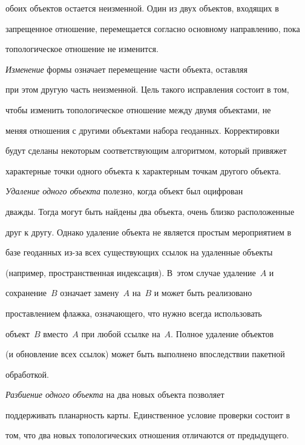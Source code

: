 обоих объектов остается неизменной. Один из двух объектов, входящих в 


запрещенное отношение, перемещается согласно основному направлению, пока 


топологическое отношение не изменится. 


    


    \textit{Изменение} формы означает перемещение части объекта, оставляя 


при этом другую часть неизменной. Цель такого исправления состоит в том, 


чтобы изменить топологическое отношение между двумя объектами, не 


меняя отношения с другими объектами набора геоданных. Корректировки 


будут сделаны некоторым соответствующим алгоритмом, который привяжет 


характерные точки одного объекта к характерным точкам другого объекта. 


    


    \textit{Удаление одного объекта} полезно, когда объект был оцифрован 


дважды. Тогда могут быть найдены два объекта, очень близко расположенные 


друг к другу. Однако удаление объекта не является простым мероприятием в 


базе геоданных из-за всех существующих ссылок на удаленные объекты 


(например, пространственная индексация). В~этом случае удаление~$A$ и 


сохранение~$B$ означает замену~$A$ на~$B$ и может быть реализовано 


проставлением флажка, означающего, что нужно всегда использовать 


объект~$B$ вместо~$A$ при любой ссылке на~$A$. Полное удаление объектов 


(и обновление всех ссылок) может быть выполнено впоследствии пакетной 


обработкой. 


    


    \textit{Разбиение одного объекта} на два новых объекта позволяет 


поддерживать планарность карты. Единственное условие проверки состоит в 


том, что два новых топологических отношения отличаются от предыдущего. 


